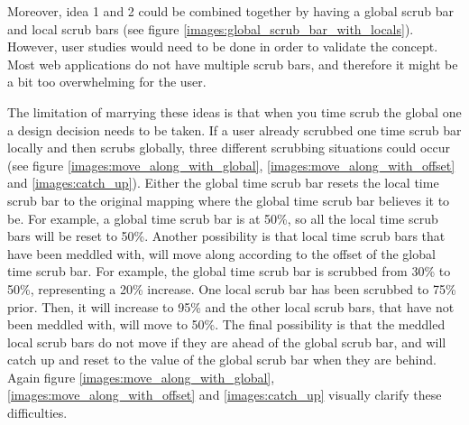 
Moreover, idea 1 and 2 could be combined together by having a global scrub bar and local scrub bars (see figure \ref{images:global_scrub_bar_with_locals}). However, user studies would need to be done in order to validate the concept. Most web applications do not have multiple scrub bars, and therefore it might be a bit too overwhelming for the user.



The limitation of marrying these ideas is that when you time scrub the global one a design decision needs to be taken. If a user already scrubbed one time scrub bar locally and then scrubs globally, three different scrubbing situations could occur (see figure \ref{images:move_along_with_global}, \ref{images:move_along_with_offset} and \ref{images:catch_up}). Either the global time scrub bar resets the local time scrub bar to the original mapping where the global time scrub bar believes it to be. For example, a global time scrub bar is at 50\%, so all the local time scrub bars will be reset to 50\%. Another possibility is that local time scrub bars that have been meddled with, will move along according to the offset of the global time scrub bar. For example, the global time scrub bar is scrubbed from 30\% to 50\%, representing a 20\% increase. One local scrub bar has been scrubbed to 75\% prior. Then, it will increase to 95\% and the other local scrub bars, that have not been meddled with, will move to 50\%. The final possibility is that the meddled local scrub bars do not move if they are ahead of the global scrub bar, and will catch up and reset to the value of the global scrub bar when they are behind. Again figure \ref{images:move_along_with_global}, \ref{images:move_along_with_offset} and \ref{images:catch_up} visually clarify these difficulties.



